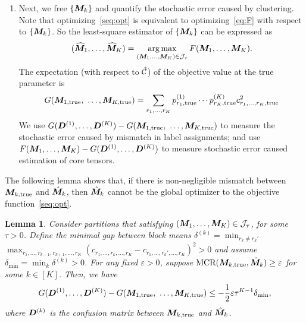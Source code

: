 \documentclass{article}
\newtheorem{lemma}{Lemma}
\begin{document}
\begin{appendices}
\begin{enumerate}
\item Next, we free $\{\bm M_k\}$ and quantify the stochastic error caused by clustering. Note that optimizing~\eqref{seq:opt} is equivalent to optimizing~\eqref{eq:F} with respect to $\{\bm M_k\}$. So the least-square estimator of $\{\bm M_k\}$ can be expressed as
\begin{equation}
   (\widehat{\bm M}_1,\ldots,\widehat{\bm M}_K) = \displaystyle\operatorname*{arg\,max}_{(\bm M_1,\ldots,\bm M_K)\in \mathcal{J}_\tau}F(\bm M_1,\ldots,\bm M_K).
\end{equation}
The expectation (with respect to $\hat {\mathcal{C}}$) of the objective value at the true parameter is
\[
G(\mM_{1,\text{true}},\ \ldots,\mM_{K,\text{true}})=\sum_{r_1,\ldots,r_K} p^{(1)}_{r_1,\text{true}} \cdots p^{(K)}_{r_K,\text{true}}c^2_{r_1,\ldots,r_K,\text{true}}
\]
We use $ G(\mD^{(1)},\ldots,\mD^{(K)})-G(\mM_{1,\text{true}},\ \ldots,\mM_{K,\text{true}})$ to measure the stochastic error caused by mismatch in label assignments; and use $F(\bm M_1,\ldots,\bm M_K)-G(\bm{D}^{(1)},\ldots,\bm{D}^{(K)})$ to measure stochastic error caused estimation of core tensors.  


\end{enumerate}

The following lemma shows that, if there is non-negligible mismatch between $\bm M_{k,\text{true}}$ and $\hat {\bm M}_k$, then $\hat {\bm M}_k$ cannot be the global optimizer to the objective function~\eqref{seq:opt}.

\begin{lemma}\label{1}
Consider partitions that satisfying $(\bm M_1,\ldots,\bm M_K)\in \mathcal{J}_\tau$, for some $\tau>0$. 
Define the minimal gap between block means $\delta^{(k)}=\min_{r_k\neq r_k'}$ $\max_{r_1,\ldots,r_{k-1},r_{k+1},\ldots,r_K}(c_{r_1,\ldots,r_k,\ldots,r_K}-c_{r_1,\ldots,r_k',\ldots,r_K})^2>0$ and assume $\delta_{\min}=\min_k\delta^{(k)}>0$. For any fixed $\varepsilon>0$, suppose $\text{MCR}(\bm M_{k,\text{true}}, \hat {\bm M}_k)\geq \varepsilon $ for some $k\in[K]$. Then, we have
\begin{equation*}
    G(\mD^{(1)},\ldots,\mD^{(K)})-G(\mM_{1,\text{true}},\ \ldots,\mM_{K,\text{true}}) \leq -\frac{1}{2}\varepsilon\tau^{K-1}\delta_{\min},
\end{equation*}
where $\bm{D}^{(k)}$ is the confusion matrix between $\bm M_{k,\text{true}}$ and $\hat {\bm M}_k$.
\end{lemma}


\end{appendices}
\end{document}

